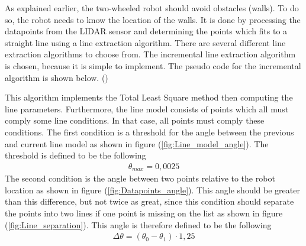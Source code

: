 \documentclass[../Head/Main.tex]{subfiles}
\begin{document}
\clearpage
As explained earlier, the two-wheeled robot should avoid obstacles (walls). To do so, the robot needs to know the location of the walls. It is done by processing the datapoints from the LIDAR sensor and determining the points which fits to a straight line using a line extraction algorithm. There are several different line extraction algorithms to choose from. The incremental line extraction algorithm is chosen, because it is simple to implement. The pseudo code for the incremental algorithm is shown below. (\cite{LEA}) \par

This algorithm implements the Total Least Square method then computing the line parameters. Furthermore, the line model consists of points which all must comply some line conditions. In that case, all points must comply these conditions. The first condition is a threshold for the angle between the previous and current line model as shown in figure (\ref{fig:Line_model_angle}). The threshold is defined to be the following 
\begin{align*}
	\theta_{max} = 0,0025
\end{align*}
The second condition is the angle between two points relative to the robot location as shown in figure (\ref{fig:Datapoints_angle}). This angle should be greater than this difference, but not twice as great, since this condition should separate the points into two lines if one point is missing on the list as shown in figure (\ref{fig:Line_separation}). This angle is therefore defined to be the following
\begin{align*}
	\Delta\theta = \left(\theta_0 - \theta_1\right)\cdot 1,25
\end{align*}

\end{document}
